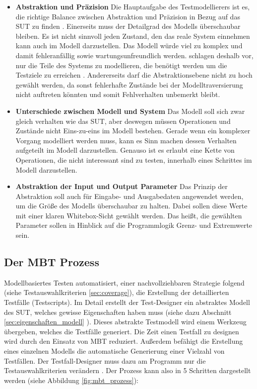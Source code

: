 \begin{itemize}
\item \textbf{Abstraktion und Präzision} Die Hauptaufgabe des Testmodellierers ist es, die richtige Balance zwischen Abstraktion und Präzision in Bezug auf das \gls{SUT} zu finden \cite{utting_practical_2007}. Einerseits muss der Detailgrad des Modells überschaubar bleiben. Es ist nicht sinnvoll jeden Zustand, den das reale System einnehmen kann auch im Modell darzustellen. Das Modell würde viel zu komplex und damit fehleranfällig sowie wartungsunfreundlich werden. \citeauthor{utting_practical_2007} schlagen deshalb vor, nur die Teile des Systems zu modellieren, die benötigt werden um die Testziele zu erreichen \cite{utting_practical_2007}. Andererseits darf die Abstraktionsebene nicht zu hoch gewählt werden, da sonst fehlerhafte Zustände bei der Modelltraversierung nicht auftreten könnten und somit Fehlverhalten unbemerkt bleibt. 
\item \textbf{Unterschiede zwischen Modell und System} Das Modell soll sich zwar gleich verhalten wie das \gls{SUT}, aber deswegen müssen Operationen und Zustände nicht Eins-zu-eins im Modell bestehen. Gerade wenn ein komplexer Vorgang modelliert werden muss, kann es Sinn machen dessen Verhalten aufgeteilt im Modell darzustellen. Genauso ist es erlaubt eine Kette von Operationen, die nicht interessant sind zu testen, innerhalb eines Schrittes im Modell darzustellen.
\item \textbf{Abstraktion der Input und Output Parameter} Das Prinzip der Abstraktion soll auch für Eingabe- und Ausgabedaten angewendet werden, um die Größe des Modells überschaubar zu halten. Dabei sollen diese Werte mit einer klaren Whitebox-Sicht gewählt werden. Das heißt, die gewählten Parameter sollen in Hinblick auf die Programmlogik Grenz- und Extremwerte sein.     
\end{itemize}

\subsection{Der MBT Prozess}
\label{sec:mbt_prozess}

Modellbasiertes Testen automatisiert, einer nachvollziehbaren Strategie folgend (siehe Testauswahlkriterien \ref{sec:coverage}), die Erstellung der detaillierten Testfälle (Testscripts).
Im Detail erstellt der Test-Designer ein abstraktes Modell des \Gls{SUT}, welches gewisse Eigenschaften haben muss (siehe dazu Abschnitt \ref{sec:eigenschaften_modell} ). Dieses abstrakte Testmodell wird einem Werkzeug übergeben, welches die Testfälle generiert. Die Zeit einen Testfall zu designen wird durch den Einsatz von \Gls{MBT} reduziert. Außerdem befähigt die Erstellung eines einzelnen Modells die automatische Generierung einer Vielzahl von Testfällen. Der Testfall-Designer muss dazu am Programm nur die Testauswahlkriterien verändern \cite{utting_practical_2007}. Der Prozess kann also in 5 Schritten dargestellt werden (siehe Abbildung \ref{fig:mbt_prozess}):

